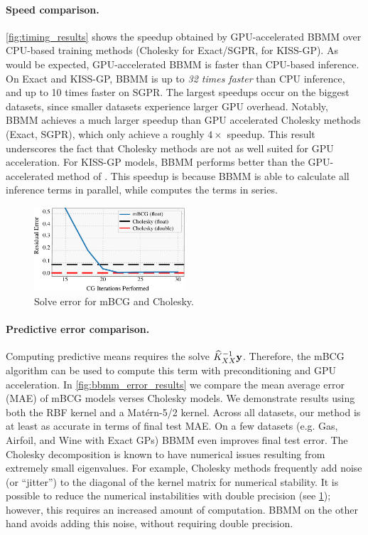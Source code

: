 \paragraph{Speed comparison.}
\cref{fig:timing_results} shows the speedup obtained by GPU-accelerated BBMM over CPU-based training methods (Cholesky for Exact/SGPR, \citet{dong2017scalable} for KISS-GP).
As would be expected, GPU-accelerated BBMM is faster than CPU-based inference.
On Exact and KISS-GP, BBMM is up to \emph{32 times faster} than CPU inference, and up to 10 times faster on SGPR.
The largest speedups occur on the biggest datasets, since smaller datasets experience larger GPU overhead.
Notably, BBMM achieves a much larger speedup than GPU accelerated Cholesky methods (Exact, SGPR), which only achieve a roughly $4\times$ speedup.
This result underscores the fact that Cholesky methods are not as well suited for GPU acceleration.
For KISS-GP models, BBMM performs better than the GPU-accelerated method of \citet{dong2017scalable}.
This speedup is because BBMM is able to calculate all inference terms in parallel, while \citet{dong2017scalable} computes the terms in series.

\begin{figure}[t!]
  \begin{center}
    \includegraphics[width=0.50\textwidth]{figures/cg_error}
  \end{center}
  \caption{Solve error for mBCG and Cholesky. \label{fig:cg_error}}
\end{figure}

\paragraph{Predictive error comparison.}
Computing predictive means requires the solve $\widehat{K}_{XX}^{-1} \mathbf{y}$.
Therefore, the mBCG algorithm can be used to compute this term with preconditioning and GPU acceleration.
In \cref{fig:bbmm_error_results} we compare the mean average error (MAE) of mBCG models verses Cholesky models.
We demonstrate results using both the RBF kernel and a Mat\'ern-5/2 kernel.
Across all datasets, our method is at least as accurate in terms of final test MAE.
On a few datasets (e.g. Gas, Airfoil, and Wine with Exact GPs) BBMM even improves final test error.
The Cholesky decomposition is known to have numerical issues resulting from extremely small eigenvalues.
For example, Cholesky methods frequently add noise (or ``jitter'') to the diagonal of the kernel matrix for numerical stability.
It is possible to reduce the numerical instabilities with double precision (see \cref{fig:cg_error}); however, this requires an increased amount of computation.
BBMM on the other hand avoids adding this noise, without requiring double precision.

